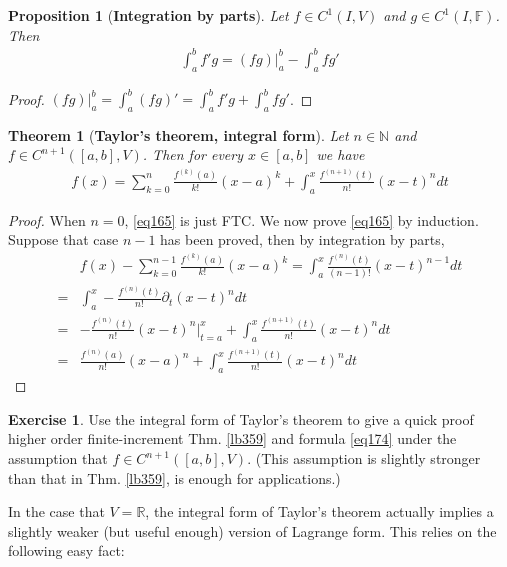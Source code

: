 \documentclass[12pt,b5paper,notitlepage]{article}
\theoremstyle{definition}
\newtheorem{exe}[df]{Exercise}
\theoremstyle{plain}
\newtheorem{thm}[df]{Theorem}
\newtheorem{pp}[df]{Proposition}
\newcommand{\Nbb}{\mathbb N}
\newcommand{\Rbb}{\mathbb R}
\newcommand{\Fbb}{\mathbb F}
\numberwithin{equation}{section}
\begin{document}
\begin{pp}[\textbf{Integration by parts}]  
Let $f\in C^1(I,V)$ and $g\in C^1(I,\Fbb)$. Then
\begin{align}
\int_a^b f'g=(fg)\big|_a^b-\int_a^b fg'
\end{align}
\end{pp}


\begin{proof}
$(fg)\big|_a^b=\int_a^b(fg)'=\int_a^bf'g+\int_a^b fg'$.
\end{proof}

\begin{thm}[\textbf{Taylor's theorem, integral form}]   \label{lb425}
Let $n\in\Nbb$ and $f\in C^{n+1}([a,b],V)$. Then for every $x\in[a,b]$ we have
\begin{align}\label{eq165}
f(x)=\sum_{k=0}^n\frac{f^{(k)}(a)}{k!}(x-a)^k+\int_a^x\frac{f^{(n+1)}(t)}{n!}(x-t)^ndt
\end{align}
\end{thm}

\begin{proof}
When $n=0$, \eqref{eq165} is just FTC. We now prove \eqref{eq165} by induction. Suppose that case $n-1$ has been proved, then by integration by parts,
\begin{align*}
&f(x)-\sum_{k=0}^{n-1}\frac{f^{(k)}(a)}{k!}(x-a)^k=\int_a^x\frac{f^{(n)}(t)}{(n-1)!}(x-t)^{n-1}dt\\
=&\int_a^x -\frac{f^{(n)}(t)}{n!}\partial_t(x-t)^ndt\\
=&-\frac{f^{(n)}(t)}{n!}(x-t)^n\Big|_{t=a}^x+\int_a^x\frac{f^{(n+1)}(t)}{n!}(x-t)^ndt\\
=&\frac {f^{(n)}(a)}{n!}(x-a)^n+\int_a^x\frac{f^{(n+1)}(t)}{n!}(x-t)^ndt
\end{align*}
\end{proof}


\begin{exe}
Use the integral form of Taylor's theorem to give a quick proof higher order finite-increment Thm. \ref{lb359} and formula \eqref{eq174} under the assumption that $f\in C^{n+1}([a,b],V)$. (This assumption is slightly stronger than that in Thm. \ref{lb359}, is enough for applications.)
\end{exe}




In the case that $V=\Rbb$, the integral form of Taylor's theorem actually implies a slightly weaker (but useful enough) version of Lagrange form. This relies on the following easy fact:
\end{document}
